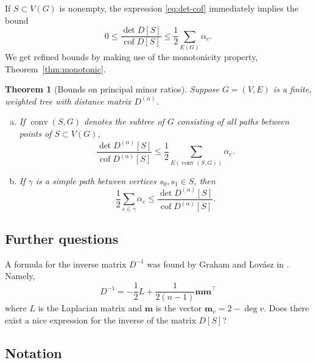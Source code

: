 \documentclass{amsart}
\newtheorem{thm}{Theorem}[section]
\newtheorem{cor}[thm]{Corollary}
\theoremstyle{definition}
\newcommand{\boldm}{\mathbf{m}}
\newcommand{\Da}{{D^{(\alpha)}}}
\newcommand{\tr}{\intercal}
\DeclareMathOperator{\cof}{cof}
\DeclareMathOperator{\conv}{conv}
\begin{document}
If $S \subset V(G)$ is nonempty,
the expression \eqref{eq:det-cof} immediately implies the bound
\begin{equation*}
0 \leq \frac{\det D[S]}{\cof D[S]} \leq \frac12 \sum_{E(G)} \alpha_e .
\end{equation*}
We get refined bounds by making use of the monotonicity property, Theorem~\ref{thm:monotonic}.

\begin{thm}[Bounds on principal minor ratios]
\label{thm:det-cof-bounds}
Suppose $G = (V,E)$ is a finite, weighted tree with distance matrix $\Da$.
\begin{enumerate}[(a)]
\item 
If $\conv(S,G)$ denotes the subtree of $G$ consisting of all paths between points of $S \subset V(G)$,
\begin{equation*}
 \frac{\det \Da[S]}{\cof \Da[S]} \leq \frac12 \sum_{E(\conv(S, G))} \alpha_e .
\end{equation*}

\item 
If $\gamma$ is a simple path between vertices $s_0, s_1 \in S$, then
\begin{equation*}
	\frac12 \sum_{e \in \gamma} \alpha_e \leq \frac{\det \Da[S]}{\cof \Da[S]}.
\end{equation*}
\end{enumerate}
\end{thm}


\subsection{Further questions} 
A formula for the inverse matrix $D^{-1}$ was found by Graham and Lov\'{a}sz in \cite{graham-lovasz}.
Namely,
\[
	D^{-1} = - \frac12 L + \frac1{2(n - 1)} \boldm \boldm^\tr
\]
where $L$ is the Laplacian matrix and $\boldm$ is the vector $\boldm_v = 2 - \deg v$.
Does there exist a nice expression for the inverse of the matrix $D[S]$?

\subsection{Notation}
\end{document}
